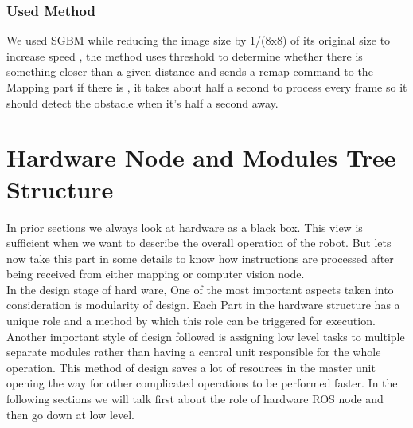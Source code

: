 \documentclass[12pt]{article}
\newcommand\blankpage{%
	\null
	\thispagestyle{empty}%
	\addtocounter{page}{-1}%
	\newpage}
\begin{document}
\subsubsection{Used Method}
We used SGBM while reducing the image size by 1/(8x8) of its original size to increase speed , the method uses threshold to determine whether there is something closer than a given distance and sends a remap command to the Mapping part if there is , it takes about half a second to process every frame so it should detect the obstacle when it’s half a second away.

\afterpage{\blankpage}
\newpage

\section{Hardware Node and Modules Tree Structure}
In prior sections we always look at hardware as a black box. This view is sufficient when we want to describe the overall operation of the robot. But lets now take this part in some details to know how instructions are processed after being received from either mapping or computer vision node. \\
In the design stage of hard ware, One of the most important aspects taken into consideration is modularity of design. Each Part in the hardware structure has a unique role and a method by which this role can be triggered for execution. Another important style of design followed is assigning low level tasks to multiple separate modules rather than having a central unit responsible for the whole operation. This method of design saves a lot of resources in the master unit opening the way for other complicated operations to be performed faster. In the following sections we will talk first about the role of hardware ROS node and then go down at low level.
\end{document}
